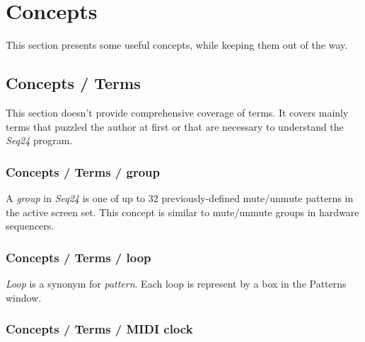 %
%
%

\section{Concepts}
\label{sec:concepts}

   This section presents some useful concepts, while keeping them out of the
   way.

\subsection{Concepts / Terms}
\label{subsec:concepts_terms}

   This section doesn't provide comprehensive coverage of terms.  It
   covers mainly terms that puzzled the author at first or that are
   necessary to understand the \textsl{Seq24} program.

\subsubsection{Concepts / Terms / group}
\label{subsubsec:concepts_terms_group}

   A \textsl{group} in \textsl{Seq24} is one of up to 32 previously-defined
   mute/unmute patterns in the active screen set.
   This concept is similar to mute/unmute groups in hardware sequencers.

\subsubsection{Concepts / Terms / loop}
\label{subsubsec:concepts_terms_loop}

   \textsl{Loop}
   is a synonym for \textsl{pattern}.
   Each loop is represent by a box in the Patterns window.

\subsubsection{Concepts / Terms / MIDI clock}
\label{subsubsec:concepts_terms_midi_clock}


